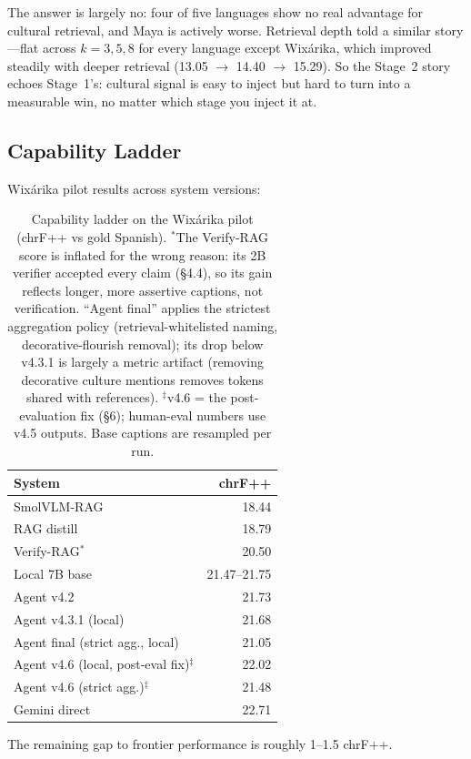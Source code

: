 \documentclass[11pt]{article}
\begin{document}
The answer is largely no: four of five languages show no real advantage
for cultural retrieval, and Maya is actively worse. Retrieval depth told a
similar story---flat across $k{=}3,5,8$ for every language except
Wixárika, which improved steadily with deeper retrieval (13.05 $\to$
14.40 $\to$ 15.29). So the Stage~2 story echoes Stage~1's: cultural signal
is easy to inject but hard to turn into a measurable win, no matter which
stage you inject it at.

\subsection{Capability Ladder}
Wixárika pilot results across system versions:

\begin{table}[h]
\centering
\small
\begin{tabular}{lr}
\toprule
System & chrF++ \\
\midrule
SmolVLM-RAG        & 18.44 \\
RAG distill        & 18.79 \\
Verify-RAG$^{*}$   & 20.50 \\
Local 7B base      & 21.47--21.75 \\
Agent v4.2         & 21.73 \\
Agent v4.3.1 (local) & 21.68 \\
Agent final (strict agg., local) & 21.05 \\
Agent v4.6 (local, post-eval fix)$^{\ddagger}$ & 22.02 \\
Agent v4.6 (strict agg.)$^{\ddagger}$ & 21.48 \\
Gemini direct      & 22.71 \\
\bottomrule
\end{tabular}
\caption{Capability ladder on the Wixárika pilot (chrF++ vs gold Spanish).
$^{*}$The Verify-RAG score is inflated for the wrong reason: its 2B verifier
accepted every claim (\S4.4), so its gain reflects longer, more assertive
captions, not verification. ``Agent final'' applies the strictest
aggregation policy (retrieval-whitelisted naming, decorative-flourish
removal); its drop below v4.3.1 is largely a metric artifact (removing
decorative culture mentions removes tokens shared with references).
$^{\ddagger}$v4.6 = the post-evaluation fix (\S6); human-eval numbers use
v4.5 outputs. Base captions are resampled per run.}
\label{tab:ladder}
\end{table}

The remaining gap to frontier performance is roughly 1--1.5 chrF++.
\end{document}
